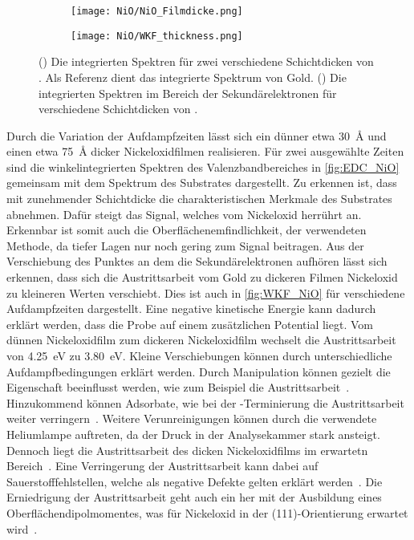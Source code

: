         \begin{figure}
            \centering
            \begin{subfigure}[t]{0.48\textwidth}
                \centering
                \texttt{[image: NiO/NiO\_Filmdicke.png]}
                \subcaption{}
                \label{fig:EDC_NiO}
            \end{subfigure}
            \begin{subfigure}[t]{0.48\textwidth}
                \centering
                \texttt{[image: NiO/WKF\_thickness.png]}
                \caption{}
                \label{fig:WKF_NiO}
            \end{subfigure}
            \caption{() Die integrierten Spektren für zwei verschiedene Schichtdicken von . Als Referenz dient das integrierte Spektrum von Gold. 
            () Die integrierten Spektren im Bereich der Sekundärelektronen für verschiedene Schichtdicken von .}
        \end{figure}
        Durch die Variation der Aufdampfzeiten lässt sich ein dünner etwa \SI{30}{\angstrom} und einen etwa \SI{75}{\angstrom} dicker Nickeloxidfilmen realisieren.
        Für zwei ausgewählte Zeiten sind die winkelintegrierten Spektren des Valenzbandbereiches in \autoref{fig:EDC_NiO} gemeinsam mit dem Spektrum des Substrates dargestellt.
        Zu erkennen ist, dass mit zunehmender Schichtdicke die charakteristischen Merkmale des Substrates abnehmen.
        Dafür steigt das Signal, welches vom Nickeloxid herrührt an.
        Erkennbar ist somit auch die Oberflächenemfindlichkeit, der verwendeten Methode, da tiefer Lagen nur noch gering zum Signal beitragen.
        Aus der Verschiebung des Punktes an dem die Sekundärelektronen aufhören lässt sich erkennen, dass sich die Austrittsarbeit vom Gold zu dickeren Filmen Nickeloxid zu kleineren Werten verschiebt.
        Dies ist auch in \autoref{fig:WKF_NiO} für verschiedene Aufdampfzeiten dargestellt.
        Eine negative kinetische Energie kann dadurch erklärt werden, dass die Probe auf einem zusätzlichen Potential liegt.
        Vom dünnen Nickeloxidfilm zum dickeren Nickeloxidfilm wechselt die Austrittsarbeit von \SI{4.25}{\electronvolt} zu \SI{3.80}{\electronvolt}.
        Kleine Verschiebungen können durch unterschiedliche Aufdampfbedingungen erklärt werden.
        Durch Manipulation können gezielt die Eigenschaft beeinflusst werden, wie zum Beispiel die Austrittsarbeit~\cite{poulain_electronic_2020}.
        Hinzukommend können Adsorbate, wie bei der -Terminierung die Austrittsarbeit weiter verringern~\cite{NiO_40}.
        Weitere Verunreinigungen können durch die verwendete Heliumlampe auftreten, da der Druck in der Analysekammer stark ansteigt.
        Dennoch liegt die Austrittsarbeit des dicken Nickeloxidfilms im erwartetn Bereich~\cite{poulain_electronic_2020}.
        Eine Verringerung der Austrittsarbeit kann dabei auf Sauerstofffehlstellen, welche als negative Defekte gelten erklärt werden~\cite{IF_3}.
        Die Erniedrigung der Austrittsarbeit geht auch ein her mit der Ausbildung eines Oberflächendipolmomentes, was für Nickeloxid in der (111)-Orientierung erwartet wird~\cite{5A_5}.

